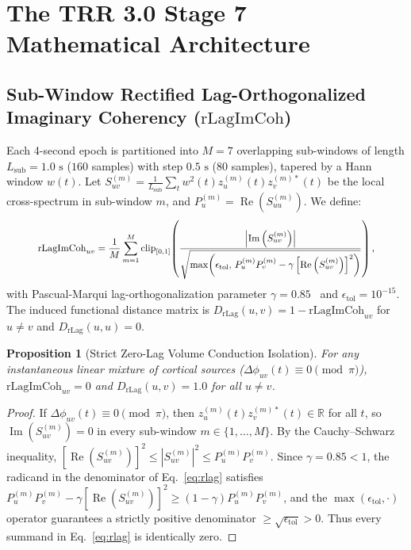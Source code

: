 \documentclass[10pt,twocolumn]{article}
\newtheorem{proposition}{Proposition}
\begin{document}
\section{The TRR 3.0 Stage 7 Mathematical Architecture}

\subsection{Sub-Window Rectified Lag-Orthogonalized Imaginary Coherency ($\mathrm{rLagImCoh}$)}
Each 4-second epoch is partitioned into $M = 7$ overlapping sub-windows of length $L_{\mathrm{sub}} = 1.0\text{ s}$ ($160$ samples) with step $0.5\text{ s}$ ($80$ samples), tapered by a Hann window $w(t)$. Let $S_{uv}^{(m)} = \frac{1}{L_{\mathrm{sub}}}\sum_{t} w^2(t) z_u^{(m)}(t) z_v^{(m)*}(t)$ be the local cross-spectrum in sub-window $m$, and $P_u^{(m)} = \operatorname{Re}(S_{uu}^{(m)})$. We define:
\begin{equation}
\resizebox{0.88\columnwidth}{!}{$\displaystyle
    \mathrm{rLagImCoh}_{uv} = \frac{1}{M}\sum_{m=1}^{M} \mathrm{clip}_{[0,1]}\!\left(\frac{\left|\operatorname{Im}\left(S_{uv}^{(m)}\right)\right|}{\sqrt{\max\!\left(\epsilon_{\mathrm{tol}},\, P_u^{(m)}P_v^{(m)} - \gamma\left[\operatorname{Re}\left(S_{uv}^{(m)}\right)\right]^2\right)}}\right),
$}
    \label{eq:rlag}
\end{equation}
with Pascual-Marqui lag-orthogonalization parameter $\gamma = 0.85$~\cite{pascual2007} and $\epsilon_{\mathrm{tol}} = 10^{-15}$. The induced functional distance matrix is $D_{\mathrm{rLag}}(u,v) = 1 - \mathrm{rLagImCoh}_{uv}$ for $u \neq v$ and $D_{\mathrm{rLag}}(u,u) = 0$.

\begin{proposition}[Strict Zero-Lag Volume Conduction Isolation]
For any instantaneous linear mixture of cortical sources ($\Delta\phi_{uv}(t) \equiv 0 \pmod\pi$), $\mathrm{rLagImCoh}_{uv} = 0$ and $D_{\mathrm{rLag}}(u,v) = 1.0$ for all $u \neq v$.
\end{proposition}
\begin{proof}
If $\Delta\phi_{uv}(t) \equiv 0 \pmod\pi$, then $z_u^{(m)}(t)z_v^{(m)*}(t) \in \mathbb{R}$ for all $t$, so $\operatorname{Im}(S_{uv}^{(m)}) = 0$ in every sub-window $m \in \{1,\dots,M\}$. By the Cauchy--Schwarz inequality, $[\operatorname{Re}(S_{uv}^{(m)})]^2 \le |S_{uv}^{(m)}|^2 \le P_u^{(m)}P_v^{(m)}$. Since $\gamma = 0.85 < 1$, the radicand in the denominator of Eq.~\eqref{eq:rlag} satisfies $P_u^{(m)}P_v^{(m)} - \gamma[\operatorname{Re}(S_{uv}^{(m)})]^2 \ge (1-\gamma)P_u^{(m)}P_v^{(m)}$, and the $\max(\epsilon_{\mathrm{tol}}, \cdot)$ operator guarantees a strictly positive denominator $\ge \sqrt{\epsilon_{\mathrm{tol}}} > 0$. Thus every summand in Eq.~\eqref{eq:rlag} is identically zero.
\end{proof}
\end{document}
